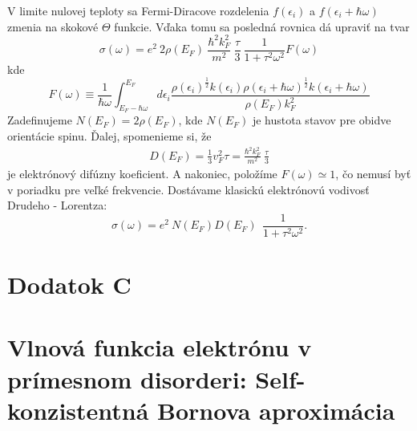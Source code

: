V limite nulovej teploty sa Fermi-Diracove rozdelenia $f(\epsilon_i)$ a $f(\epsilon_i+\hbar\omega)$ zmenia na skokové $\Theta$ funkcie. Vďaka tomu sa posledná rovnica dá upraviť na tvar
\begin{equation}
\label{eq:03kubo}
\sigma(\omega)=
e^2\ 2\rho(E_F)\ \frac{\hbar^{2}k_{F}^{2}}{m^{2}}\ \frac{\tau}{3}\
\frac{1}{1+\tau^2\omega^2} F(\omega)
\end{equation}
kde
\begin{equation}
\label{eq:Fomega}
F(\omega)\equiv\frac{1}{\hbar\omega}\int_{E_F-\hbar\omega}^{E_F}d\epsilon_i \frac{\rho(\epsilon_i)^{\frac{1}{2}}k(\epsilon_i)\rho(\epsilon_i+\hbar\omega)^{\frac{1}{2}}k(\epsilon_i+\hbar\omega)}{\rho(E_F)k_F^2}
\end{equation}
Zadefinujeme $N(E_F)=2\rho(E_F)$, kde $N(E_F)$ je hustota stavov pre obidve orientácie spinu. Ďalej,
spomenieme si, že
\begin{align}
D(E_F)=\frac{1}{3}v_F^2\tau = \frac{\hbar^{2}k_{F}^{2}}{m^{2}}\ \frac{\tau}{3}
\end{align}
je elektrónový difúzny koeficient. A nakoniec, položíme $F(\omega) \simeq 1$, čo nemusí byť v poriadku pre veľké frekvencie. Dostávame klasickú elektrónovú vodivosť Drudeho - Lorentza:
\begin{equation}
\label{eq:03kubofinal}
\sigma(\omega)=
e^2\ N(E_F) D(E_F)\ \
\frac{1}{1+\tau^2\omega^2} \text{.}
\end{equation}








 \section*{Dodatok C}

\section{Vlnová funkcia elektrónu v prímesnom disorderi: Self-konzistentná Bornova aproximácia}
\label{sec:thouless}


